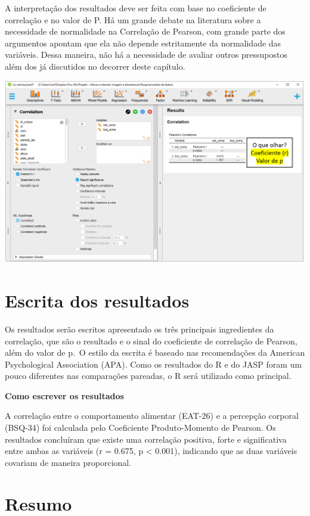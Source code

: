 \documentclass[
]{book}
\begin{document}
A interpretação dos resultados deve ser feita com base no coeficiente de correlação e no valor de P. Há um grande debate na literatura sobre a necessidade de normalidade na Correlação de Pearson, com grande parte dos argumentos apontam que ela não depende estritamente da normalidade das variáveis. Dessa maneira, não há a necessidade de avaliar outros pressupostos além dos já discutidos no decorrer deste capítulo.

\includegraphics{./img/cap_correlacao_resultados.png}

\hypertarget{escrita-dos-resultados-12}{%
\section{Escrita dos resultados}\label{escrita-dos-resultados-12}}

Os resultados serão escritos apresentado os três principais ingredientes da correlação, que são o resultado e o sinal do coeficiente de correlação de Pearson, além do valor de p.~O estilo da escrita é baseado nas recomendações da American Psychological Association (APA). Como os resultados do R e do JASP foram um pouco diferentes nas comparações pareadas, o R será utilizado como principal.

\textbf{Como escrever os resultados}

A correlação entre o comportamento alimentar (EAT-26) e a percepção corporal (BSQ-34) foi calculada pelo Coeficiente Produto-Momento de Pearson. Os resultados concluíram que existe uma correlação positiva, forte e significativa entre ambas as variáveis (r = 0.675, p \textless{} 0.001), indicando que as duas variáveis covariam de maneira proporcional.

\hypertarget{resumo-14}{%
\section{Resumo}\label{resumo-14}}
\end{document}
